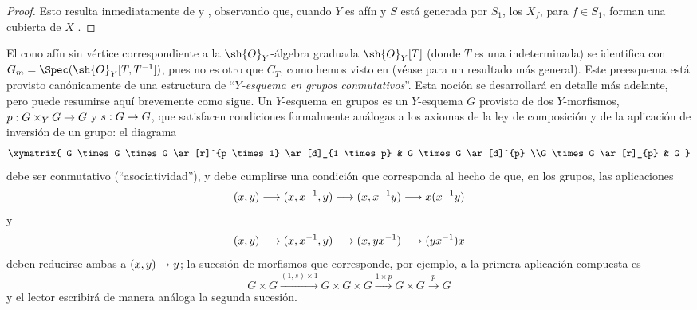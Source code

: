 \documentclass[oneside,10pt]{amsart}
\makeatletter
\newcommand{\ega@arrow}[2]{\mathchoice{#1}{#2}{#2}{#2}}
\renewcommand{\to}{\ega@arrow{\longrightarrow}{\rightarrow}}
\let\EGAOriginalLabel\label
\renewcommand{\label}[1]{\phantomsection\EGAOriginalLabel{#1}}
\makeatother
\begin{document}
\begin{proof}
Esto resulta inmediatamente de  y , observando que, cuando $Y$ es afín y $S$ está generada por $S_1$, los $X_f$, para $f\in S_1$, forman una cubierta de $X$ .
\end{proof}
\begin{remark}[8.3.9]
\label{II.8.3.9}
El cono afín sin vértice correspondiente a la $\sh{O}_Y$-álgebra graduada $\sh{O}_Y[T]$ (donde $T$ es una indeterminada) se identifica con $G_m=\Spec(\sh{O}_Y[T,T^{-1}])$, pues no es otro que $C_T$, como hemos visto en  (véase  para un resultado más general).
Este preesquema está provisto canónicamente de una estructura de \textquotedblleft\emph{$Y$-esquema en grupos conmutativos}\textquotedblright.
Esta noción se desarrollará en detalle más adelante, pero puede resumirse aquí brevemente como sigue.
Un $Y$-esquema en grupos es un $Y$-esquema $G$ provisto de dos $Y$-morfismos, $p:G\times_Y G\to G$ y $s:G\to G$, que satisfacen condiciones formalmente análogas a los axiomas de la ley de composición y de la aplicación de inversión de un grupo: el diagrama
\[
  \xymatrix{
    G \times G \times G
      \ar[r]^{p \times 1}
      \ar[d]_{1 \times p}
  & G \times G
      \ar[d]^{p}
  \\G \times G
      \ar[r]_{p}
  & G
  }
\]
debe ser conmutativo (\textquotedblleft asociatividad\textquotedblright), y debe cumplirse una condición que corresponda al hecho de que, en los grupos, las aplicaciones
\[
  (x,y)
  \to
  (x,x^{-1},y)
  \to
  (x,x^{-1}y)
  \to
  x(x^{-1}y)
\]
y
\[
  (x,y)
  \to
  (x,x^{-1},y)
  \to
  (x,yx^{-1})
  \to
  (yx^{-1})x
\]
deben reducirse ambas a $(x,y)\to y$;
la sucesión de morfismos que corresponde, por ejemplo, a la primera aplicación compuesta es
\[
  G \times G
  \xrightarrow{(1,s) \times 1}
  G \times G \times G
  \xrightarrow{1 \times p}
  G\times G
  \xrightarrow{p}
  G
\]
y el lector escribirá de manera análoga la segunda sucesión.


\end{remark}
\end{document}
